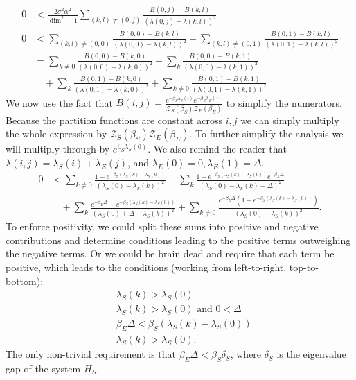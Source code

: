 \documentclass{article}
\newcommand{\partfun}{\mathcal{Z}}
\begin{document}
\begin{align}
    0 &< \frac{2 \sigma^2 \alpha^2}{\dim^2 - 1} \sum_{(k,l) \neq (0,j)} \frac{B(0, j) - B(k,l)}{(\lambda(0, j) - \lambda(k, l))^2} \\
    0 &< \sum_{(k,l) \neq (0, 0)} \frac{B(0, 0) - B(k,l)}{(\lambda(0, 0) - \lambda(k, l))^2} + \sum_{(k,l) \neq (0, 1)} \frac{B(0, 1) - B(k,l)}{(\lambda(0, 1) - \lambda(k, l))^2} \\
    &= \sum_{k \neq 0} \frac{B(0,0) - B(k, 0)}{ (\lambda(0,0) - \lambda(k, 0))^2} + \sum_{k} \frac{B(0,0) - B(k, 1)}{(\lambda(0,0) - \lambda(k, 1))^2} \nonumber \\
    &\quad + \sum_{k} \frac{B(0,1) - B(k, 0)}{(\lambda(0,1) - \lambda(k, 0))^2}  + \sum_{k \neq 0 }\frac{B(0,1) - B(k, 1)}{(\lambda(0,1) - \lambda(k, 1))^2}
\end{align}
We now use the fact that $B(i,j) = \frac{e^{-\beta_S \lambda_S(i)} e^{-\beta_E \lambda_E(j)}}{\partfun_{S}(\beta_S) \partfun_E (\beta_E)}$ to simplify the numerators. Because the partition functions are constant across $i,j$ we can simply multiply the whole expression by $\partfun_S(\beta_S) \partfun_E(\beta_E)$. To further simplify the analysis we will multiply through by $e^{\beta_S \lambda_S(0)}$. We also remind the reader that $\lambda(i,j) = \lambda_S(i) + \lambda_E(j)$, and $\lambda_E(0) = 0, \lambda_E(1) = \Delta$. 
\begin{align}
    0 &< \sum_{k \neq 0 } \frac{1 - e^{-\beta_S(\lambda_S(k) - \lambda_S(0))}}{(\lambda_S(0) - \lambda_S(k))^2} + \sum_{k} \frac{1 - e^{-\beta_S(\lambda_S(k) - \lambda_S(0))} e^{-\beta_E \Delta}}{(\lambda_S(0) - \lambda_S(k) - \Delta)^2} \nonumber \\
    &\quad + \sum_k \frac{e^{-\beta_E \Delta} - e^{-\beta_S (\lambda_S(k) - \lambda_S(0))}}{(\lambda_S(0) + \Delta - \lambda_S(k))^2} + \sum_{k \neq 0 } \frac{e^{-\beta_E \Delta}(1 - e^{-\beta_S(\lambda_S(k) - \lambda_S(0))})}{(\lambda_S(0) - \lambda_S(k))^2} .
\end{align}
To enforce positivity, we could split these sums into positive and negative contributions and determine conditions leading to the positive terms outweighing the negative terms. Or we could be brain dead and require that each term be positive, which leads to the conditions (working from left-to-right, top-to-bottom):
\begin{align}
    &\lambda_S(k) > \lambda_S(0) \\
    &\lambda_S(k) > \lambda_S(0) \text{ and } 0 < \Delta \\
    & \beta_E \Delta < \beta_S (\lambda_S(k) - \lambda_S(0)) \\
    & \lambda_S(k) > \lambda_S(0).
\end{align}
The only non-trivial requirement is that $\beta_E \Delta < \beta_S \delta_{S}$, where $\delta_{S}$ is the eigenvalue gap of the system $H_S$. 
\end{document}

